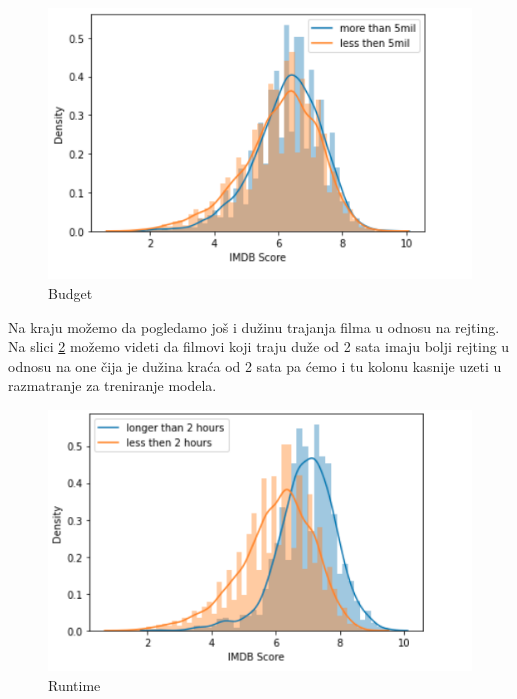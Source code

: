 \documentclass[a4paper]{article}
\begin{document}
\begin{figure}[h!]
\begin{center}
\includegraphics[scale=0.5]{budget.png}
\caption{Budget}
\label{fig:budget}
\end{center}
\end{figure}

Na kraju možemo da pogledamo još i dužinu trajanja filma u odnosu na rejting. Na slici \ref{fig:runtime} možemo videti da filmovi koji traju duže od 2 sata imaju bolji rejting u odnosu na one čija je dužina kraća od 2 sata pa ćemo i tu kolonu kasnije uzeti u razmatranje za treniranje modela.
\begin{figure}[h!]
\begin{center}
\includegraphics[scale=0.5]{runtime.png}
\caption{Runtime}
\label{fig:runtime}
\end{center}
\end{figure}
\end{document}
